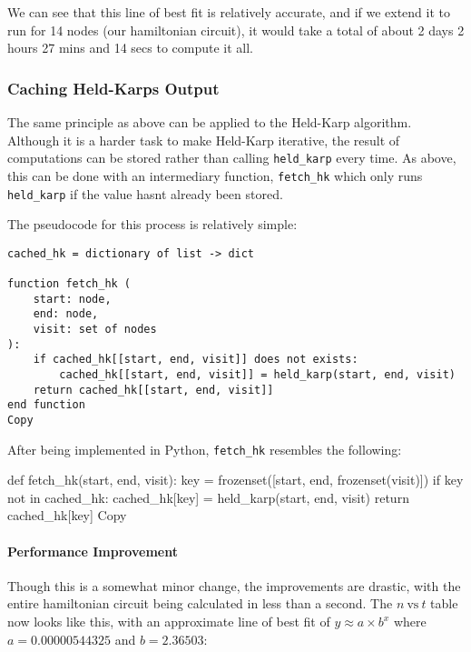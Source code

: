 \documentclass[
]{article}
\newenvironment{Shaded}{}{}
\newcommand{\NormalTok}[1]{#1}
\begin{document}
We can see that this line of best fit is relatively accurate, and if we
extend it to run for 14 nodes (our hamiltonian circuit), it would take a
total of about 2 days 2 hours 27 mins and 14 secs to compute it all.

\hypertarget{caching-held-karps-output}{%
\subsubsection{Caching Held-Karp\textquotesingle s
Output}\label{caching-held-karps-output}}

The same principle as above can be applied to the Held-Karp algorithm.
Although it is a harder task to make Held-Karp iterative, the result of
computations can be stored rather than calling \texttt{held\_karp} every
time. As above, this can be done with an intermediary function,
\texttt{fetch\_hk} which only runs \texttt{held\_karp} if the value
hasn\textquotesingle t already been stored.

The pseudocode for this process is relatively simple:

\begin{verbatim}
cached_hk = dictionary of list -> dict

function fetch_hk (
    start: node, 
    end: node,
    visit: set of nodes 
):
    if cached_hk[[start, end, visit]] does not exists:
        cached_hk[[start, end, visit]] = held_karp(start, end, visit)
    return cached_hk[[start, end, visit]]
end function
Copy
\end{verbatim}

After being implemented in Python, \texttt{fetch\_hk} resembles the
following:

\begin{Shaded}
\begin{Highlighting}[]
\NormalTok{def fetch\_hk(start, end, visit):}
\NormalTok{    key = frozenset([start, end, frozenset(visit)])}
\NormalTok{    if key not in cached\_hk:}
\NormalTok{        cached\_hk[key] = held\_karp(start, end, visit)}
\NormalTok{    return cached\_hk[key]}
\NormalTok{Copy}
\end{Highlighting}
\end{Shaded}

\hypertarget{performance-improvement-1}{%
\paragraph{Performance Improvement}\label{performance-improvement-1}}

Though this is a somewhat minor change, the improvements are drastic,
with the entire hamiltonian circuit being calculated in less than a
second. The {\(n\ \text{vs}\ t\)} table now looks like this, with an
approximate line of best fit of {\(y \approx a \times b^{x}\)} where
{\(a = 0.00000544325\)} and {\(b = 2.36503\)}:
\end{document}
